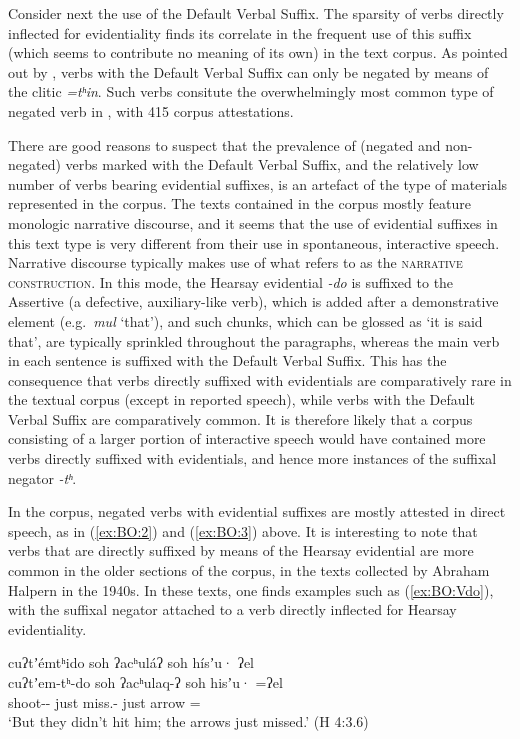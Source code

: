 \documentclass[output=paper,modfonts,nonflat,colorlinks,citecolor=brown]{langscibook}
\begin{document}
Consider next the use of the Default Verbal Suffix. The sparsity of verbs directly inflected for evidentiality finds its correlate in the frequent use of this suffix (which seems to contribute no meaning of its own) in the text corpus. As pointed out by \citet[239]{Oswalt1961}, verbs with the Default Verbal Suffix can only be negated by means of the clitic \textit{=tʰin}. Such verbs consitute the overwhelmingly most common type of negated verb in , with 415 corpus attestations.

There are good reasons to suspect that the prevalence of (negated and non-negated) verbs marked with the Default Verbal Suffix, and the relatively low number of verbs bearing evidential suffixes, is an artefact of the type of materials represented in the corpus. The texts contained in the corpus mostly feature monologic narrative discourse, and it seems that the use of evidential suffixes in this text type is very different from their use in spontaneous, interactive speech. Narrative discourse typically makes use of what \citet[34]{Oswalt1986} refers to as the \textsc{narrative construction}. In this mode, the Hearsay evidential \textit{-do} is suffixed to the Assertive (a defective, auxiliary-like verb), which is added after a demonstrative element (e.g.\ \textit{mul} `that'), and such chunks, which can be glossed as `it is said that', are typically sprinkled throughout the paragraphs, whereas the main verb in each sentence is suffixed with the Default Verbal Suffix. This has the consequence that verbs directly suffixed with evidentials are comparatively rare in the textual corpus (except in reported speech), while verbs with the Default Verbal Suffix are comparatively common. It is therefore likely that a corpus consisting of a larger portion of interactive speech would have contained more verbs directly suffixed with evidentials, and hence more instances of the suffixal negator \textit{-tʰ}.

In the corpus, negated verbs with evidential suffixes are mostly attested in direct speech, as in (\ref{ex:BO:2}) and (\ref{ex:BO:3}) above. It is interesting to note that verbs that are directly suffixed by means of the Hearsay evidential are more common in the older sections of the corpus, in the texts collected by Abraham Halpern in the 1940s. In these texts, one finds examples such as (\ref{ex:BO:Vdo}), with the suffixal negator attached to a verb directly inflected for Hearsay evidentiality.

{%
\ea 
\label{ex:BO:Vdo}
\glll cuʔtʼémtʰido soh ʔacʰuláʔ soh hísʼu· ʔel\\
    cuʔtʼem-tʰ-do soh ʔacʰulaq-ʔ soh hisʼu· =ʔel\\
    shoot-- just miss.- just arrow =\\
\glt `But they didn't hit him; the arrows just missed.' ({H 4:3.6})\\
\z
} %
\end{document}

